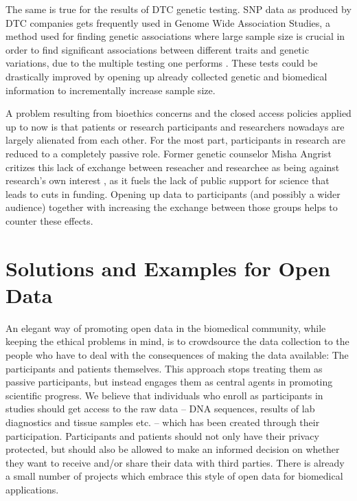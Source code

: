 \documentclass[runningheads,a4paper]{llncs}
\begin{document}
The same is true for the results of DTC genetic testing. SNP data as produced by DTC companies gets frequently used in Genome Wide Association Studies, a method used for finding genetic associations where large sample size is crucial in order to find significant associations between different traits and genetic variations, due to the multiple testing one performs \cite{hindorff}. These tests could be drastically improved by opening up already collected genetic and biomedical information to incrementally increase sample size. 

A problem resulting from bioethics concerns and the closed access policies applied up to now is that patients or research participants and researchers nowadays are largely alienated from each other. For the most part, participants in research are reduced to a completely passive role. Former genetic counselor Misha Angrist critizes this lack of exchange between reseacher and researchee as being against research's own interest \cite{angrist}, as it fuels the lack of public support for science that leads to cuts in funding. Opening up data to participants (and possibly a wider audience) together with increasing the exchange between those groups helps to counter these effects.

\section{Solutions and Examples for Open Data}
An elegant way of promoting open data in the biomedical community, while keeping the ethical problems in mind, is to crowdsource the data collection to the people who have to deal with the consequences of making the data available: The participants and patients themselves. This approach stops treating them as passive participants, but instead engages them as central agents in promoting scientific progress. We believe that individuals who enroll as participants in studies should get access to the raw data – DNA sequences, results of lab diagnostics and tissue samples etc. – which has been created through their participation. Participants and patients should not only have their privacy protected, but should also be allowed to make an informed decision on whether they want to receive and/or share their data with third parties. There is already a small number of projects which embrace this style of open data for biomedical applications. 
\end{document}
